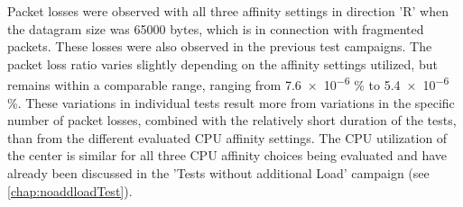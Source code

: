 Packet losses were observed with all three affinity settings in direction 'R' when the datagram size was 65000 bytes, which is in connection with fragmented packets. These losses were also observed in the previous test campaigns.  The packet loss ratio varies slightly depending on the affinity settings utilized, but remains within a comparable range, ranging from \num{7.6e-6} \%  to \num{5.4e-6} \%. These variations in individual tests result more from variations in the specific number of packet losses, combined with the relatively short duration of the tests, than from the different evaluated CPU affinity settings. The CPU utilization of the center is similar for all three CPU affinity choices being evaluated and have already been discussed in the 'Tests without additional Load' campaign (see \ref{chap:noaddloadTest}).

